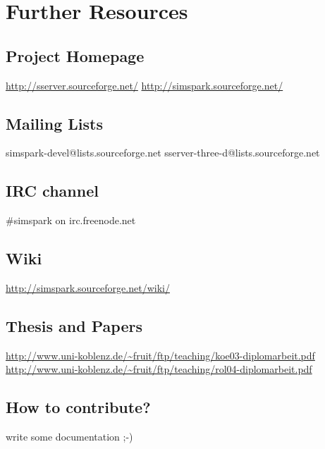 \chapter{Further Resources}


\section{Project Homepage}

\url{http://sserver.sourceforge.net/}
\url{http://simspark.sourceforge.net/}

\section{Mailing Lists}

simspark-devel@lists.sourceforge.net
sserver-three-d@lists.sourceforge.net

\section{IRC channel}

\#simspark on irc.freenode.net

\section{Wiki}

\url{http://simspark.sourceforge.net/wiki/}

\section{Thesis and Papers}

\url{http://www.uni-koblenz.de/~fruit/ftp/teaching/koe03-diplomarbeit.pdf}
\url{http://www.uni-koblenz.de/~fruit/ftp/teaching/rol04-diplomarbeit.pdf}

\section{How to contribute?}

write some documentation ;-)

